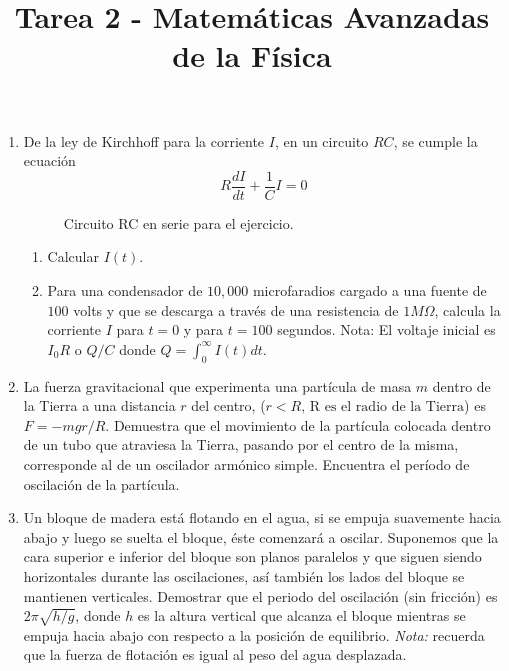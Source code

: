 
\usepackage{standalone}
\usepackage{enumerate}
\usepackage[left=1.5cm,top=1.5cm,right=1.5cm,bottom=1.5cm]{geometry}
\title{Tarea 2 - Matemáticas Avanzadas de la Física}
\date{ }

\vspace{-4cm}
\renewcommand\labelenumii{\theenumi.{\arabic{enumii}}}
\maketitle
\fontsize{14}{14}\selectfont
\begin{enumerate}
\item De la ley de Kirchhoff para la corriente $I$, en un circuito $RC$, se cumple la ecuación
\[ R \dfrac{dI}{dt} + \dfrac{1}{C} I = 0 \]
\begin{figure}[!h]
\centering

\caption{Circuito RC en serie para el ejercicio.}
\end{figure}
\begin{enumerate}[label=(\alph*)]
\item Calcular $I(t)$.
\item Para una condensador de $10,000$ microfaradios cargado a una fuente de $100$ volts y que se descarga a través de una resistencia de $1 M \Omega$, calcula la corriente $I$ para $t=0$ y para $t=100$ segundos.
Nota: El voltaje inicial es $I_{0}R$ o $Q/C$ donde $Q = \int_{0}^{\infty} I(t) dt$.
\end{enumerate}
\item La fuerza gravitacional que experimenta una partícula de masa $m$ dentro de la Tierra a una distancia $r$ del centro, ($r <R \mbox{, R es el radio de la Tierra}$) es $F=-mgr/R$. Demuestra que el movimiento de la partícula colocada dentro de un tubo que atraviesa la Tierra, pasando por el centro de la misma, corresponde al de un oscilador armónico simple. Encuentra el período de oscilación de la partícula.
\item Un bloque de madera está flotando en el agua, si se empuja suavemente hacia abajo y luego se suelta el bloque, éste comenzará a oscilar. Suponemos que la cara superior e inferior del bloque son planos paralelos y que siguen siendo horizontales durante las oscilaciones, así también los lados del bloque se mantienen verticales. Demostrar que el periodo del oscilación (sin fricción) es $2 \pi \sqrt{h/g}$, donde $h$ es la altura vertical que alcanza el bloque mientras se empuja hacia abajo con respecto a la posición de equilibrio. \emph{Nota:} recuerda que la fuerza de flotación es igual al peso del agua desplazada.

\end{enumerate}
